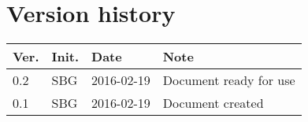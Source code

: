 \chapter*{Version history}
\label{app:rev_his}


\begin{tabular}{b{1cm} b{1cm} b{2cm} b{8cm}}
    \textbf{Ver.} & \textbf{Init.} & \textbf{Date} & \textbf{Note} \\
    \hline
    0.2 & SBG & 2016-02-19 & Document ready for use \\
    0.1 & SBG & 2016-02-19 & Document created \\
\end{tabular}
